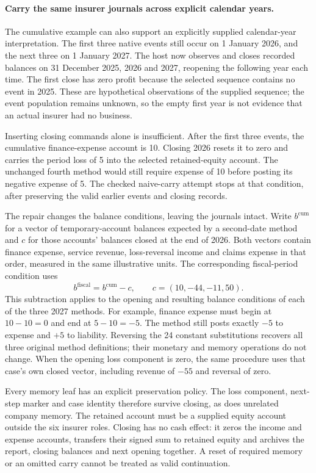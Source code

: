 \paragraph{Carry the same insurer journals across explicit calendar years.}
The cumulative example can also support an explicitly supplied calendar-year
interpretation. The first three native events still occur on 1 January 2026,
and the next three on 1 January 2027. The host now observes and closes recorded
balances on 31 December 2025, 2026 and 2027, reopening the following year each
time. The first close has zero profit because the selected sequence contains
no event in 2025. These are hypothetical observations of the supplied sequence;
the event population remains unknown, so the empty first year is not evidence
that an actual insurer had no business.

Inserting closing commands alone is insufficient. After the first three
events, the cumulative finance-expense account is 10. Closing 2026 resets it
to zero and carries the period loss of 5 into the selected retained-equity
account. The unchanged fourth method would still require expense of 10 before
posting its negative expense of 5. The checked naive-carry attempt stops at
that condition, after preserving the valid earlier events and closing records.

The repair changes the balance conditions, leaving the journals intact. Write
$b^{\mathrm{cum}}$ for a vector of temporary-account balances expected by a
second-date method and $c$ for those accounts' balances closed at the end of
2026. Both vectors contain finance expense, service revenue, loss-reversal
income and claims expense in that order, measured in the same illustrative
units. The corresponding fiscal-period condition uses
\[
 b^{\mathrm{fiscal}}=b^{\mathrm{cum}}-c,
 \qquad c=(10,-44,-11,50).
\]
This subtraction applies to the opening and resulting balance conditions of
each of the three 2027 methods. For example, finance expense must begin at
$10-10=0$ and end at $5-10=-5$. The method still posts exactly $-5$ to expense
and $+5$ to liability. Reversing the 24 constant substitutions recovers all
three original method definitions; their monetary and memory operations do
not change. When the opening loss component is zero, the same procedure uses
that case's own closed vector, including revenue of $-55$ and reversal of zero.

Every memory leaf has an explicit preservation policy. The loss component,
next-step marker and case identity therefore survive closing, as does unrelated
company memory. The retained account must be a supplied equity account outside
the six insurer roles. Closing has no cash effect: it zeros the income and
expense accounts, transfers their signed sum to retained equity and archives
the report, closing balances and next opening together. A reset of required
memory or an omitted carry cannot be treated as valid continuation.

